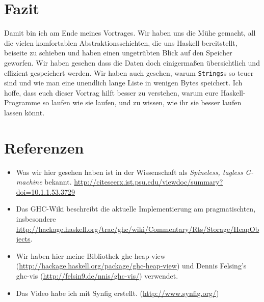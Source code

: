 \documentclass[11pt,DIV=12,parskip=half,headings=normal,abstract]{scrartcl}
\newcommand{\li}{\lstinline[style=haskell]}
\begin{document}
\begin{center}
\end{center}


\section{Fazit}

Damit bin ich am Ende meines Vortrages. Wir haben uns die Mühe gemacht, all die vielen komfortablen Abstraktionsschichten, die uns Haskell bereitstellt, beiseite zu schieben und haben einen ungetrübten Blick auf den Speicher geworfen. Wir haben gesehen dass die Daten doch einigermaßen übersichtlich und effizient gespeichert werden. Wir haben auch gesehen, warum \li-Strings-s so teuer sind und wie man eine unendlich lange Liste in wenigen Bytes speichert. Ich hoffe, dass euch dieser Vortrag hilft besser zu verstehen, warum eure Haskell-Programme so laufen wie sie laufen, und zu wissen, wie ihr sie besser laufen lassen könnt.

\section{Referenzen}

\begin{itemize}
\item Was wir hier gesehen haben ist in der Wissenschaft als \emph{Spineless, tagless G-machine} bekannt. \url{http://citeseerx.ist.psu.edu/viewdoc/summary?doi=10.1.1.53.3729}
\item Das GHC-Wiki beschreibt die aktuelle Implementierung am pragmatischten, insbesondere \url{http://hackage.haskell.org/trac/ghc/wiki/Commentary/Rts/Storage/HeapObjects}.
\item Wir haben hier meine Bibliothek ghc-heap-view (\url{http://hackage.haskell.org/package/ghc-heap-view}) und Dennis Felsing’s ghc-vis (\url{http://felsin9.de/nnis/ghc-vis/}) verwendet.
\item Das Video habe ich mit Synfig erstellt. (\url{http://www.synfig.org/})
\end{itemize}
\end{document}
